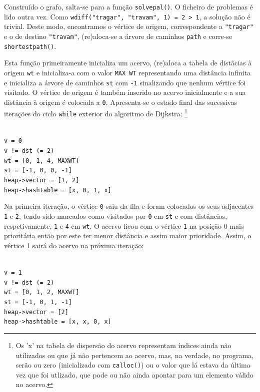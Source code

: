 \documentclass[portuguese, a4paper]{article}
\newcommand\tu[0]{\textunderscore}
\begin{document}
	\par
	Construído o grafo, salta-se para a função \texttt{solve\tu pal()}.  O
	ficheiro de problemas é lido outra vez. Como \texttt{w\tu diff("tragar",
	"travam", 1) = 2 > 1}, a solução não é trivial. Deste modo, encontramos o
	vértice de origem, correspondente a \texttt{"tragar"} e o de destino
	\texttt{"travam"}, (re)aloca-se a árvore de caminhos \texttt{path} e
	corre-se \texttt{shortest\tu path()}.
	\par
	Esta função primeiramente inicializa um acervo, (re)aloca a tabela de
	distâcias à origem \texttt{wt} e inicializa-a com o valor \texttt{MAX\tu
	WT} representando uma distância infinita e inicializa a árvore de caminhos
	\texttt{st} com \texttt{-1} sinalizando que nenhum vértice foi visitado. O
	vértice de origem é também inserido no acervo inicialmente e a sua
	distância à origem é colocada a \texttt{0}. Apresenta-se o estado final das
	sucessivas iterações do ciclo \texttt{while} exterior do algoritmo de
	Dijkstra: \footnote{Os 'x' na tabela de dispersão do acervo representam
	índices ainda não utilizados ou que já não pertencem ao acervo, mas, na
	verdade, no programa, serão ou zero (inicializado com \texttt{calloc()}) ou
	o valor que lá estava da última vez que foi utlizado, que pode ou não ainda
	apontar para um elemento válido no acervo.}
	\begin{center}
		\begin{minipage}{0.45\linewidth}
		\texttt{\\
		v = 0\\
		v != dst (= 2) \\
		wt = [0, 1, 4, MAX\tu WT] \\
		st = [-1, 0, 0, -1] \\
		heap->vector = [1, 2] \\
		heap->hash\tu table = [x, 0, 1, x] \\}
		\end{minipage}
	\end{center}
	\par
	Na primeira iteração, o vértice \texttt{0} saiu da fila e foram colocados os
	seus adjacentes \texttt{1} e \texttt{2}, tendo sido marcados como visitados
	por \texttt{0} em \texttt{st} e com distâncias, respetivamente, \texttt{1} e
	\texttt{4} em \texttt{wt}. O acervo ficou com o vértice \texttt{1} na
	posição 0 mais prioritária então por este ter menor distância e assim maior
	prioridade. Assim, o vértice 1 sairá do acervo na próxima iteração:
	\begin{center}
		\begin{minipage}{0.45\linewidth}
			\texttt{\\
			v = 1\\
			v != dst (= 2) \\
			wt = [0, 1, 2, MAX\tu WT] \\
			st = [-1, 0, 1, -1] \\
			heap->vector = [2] \\
			heap->hash\tu table = [x, x, 0, x] \\}
		\end{minipage}
		\hspace{0.05\linewidth}
	\end{center}
\end{document}
